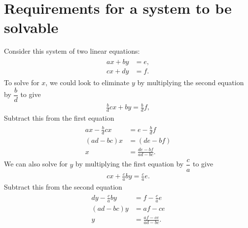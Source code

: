 \documentclass[letterpaper,10pt,english]{jupyterBook}
\begin{document}
\section{Requirements for a system to be solvable}
\label{\detokenize{_pages/2.0_Linear_systems:requirements-for-a-system-to-be-solvable}}\label{\detokenize{_pages/2.0_Linear_systems:requirements-for-systems-of-linear-equations-to-be-solvable-section}}
\sphinxAtStartPar
Consider this system of two linear equations:
\begin{equation*}
\begin{split} \begin{align*}
    ax + by &= e, \\
    cx + dy &= f.
\end{align*} \end{split}
\end{equation*}
\sphinxAtStartPar
To solve for \(x\), we could look to eliminate \(y\) by multiplying the second equation by \(\dfrac{b}{d}\) to give
\begin{equation*}
\begin{split} \frac{b}{d}c x + by = \frac{b}{d}f,\end{split}
\end{equation*}
\sphinxAtStartPar
Subtract this from the first equation
\begin{equation*}
\begin{split} \begin{align*}
    ax - \frac{b}{d}c x &= e - \frac{b}{d}f \\
    (ad - bc)x &= (de - bf) \\
    x &= \frac{de - bf}{ad - bc}.
\end{align*} \end{split}
\end{equation*}
\sphinxAtStartPar
We can also solve for \(y\) by multiplying the first equation by \(\dfrac{c}{a}\) to give
\begin{equation*}
\begin{split} c x + \frac{c}{a} b y = \frac{c}{a} e. \end{split}
\end{equation*}
\sphinxAtStartPar
Subtract this from the second equation
\begin{equation*}
\begin{split} \begin{align*}
    d y - \frac{c}{a} b y &= f - \frac{c}{a} e \\
    (ad - bc) y &= af - ce \\
    y &= \frac{af - ce}{ad - bc}.
\end{align*} \end{split}
\end{equation*}
\end{document}
